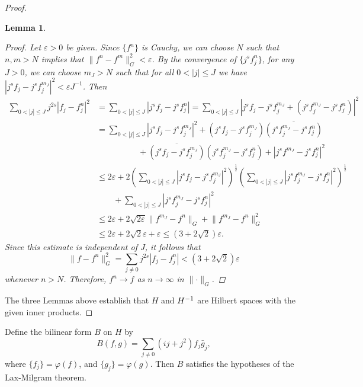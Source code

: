 \documentclass{homework}
\newtheorem{lemma}{Lemma}
\begin{document}
\begin{arabicparts}
\begin{proof}
\begin{lemma}
\begin{proof}
				Let $\varepsilon > 0$ be given. Since $\{f^n\}$ is Cauchy, we can choose $N$ such that $n,m > N$ implies that $\lVert f^n - f^m\rVert_G^2 < \varepsilon$. By the convergence of $\{j^sf^n_j\}$, for any $J > 0$, we can choose $m_J > N$ such that for all $0 < |j| \le J$ we have $|j^sf_j-j^sf^{m_J}_j|^2 < \varepsilon J^{-1}$. Then
				\newcommand{\lJ}{{0<|j|\le J}}
				\begin{align}
					\sum_\lJ j^{2s}|f_j - f^n_j|^2 &= \sum_\lJ |j^sf_j - j^sf^n_j| = \sum_\lJ |j^sf_j - j^sf^{m_J}_j + (j^sf^{m_J}_j - j^sf^n_j)|^2 \\
					&= \sum_\lJ |j^sf_j - j^sf^{m_J}_j|^2 + (j^sf_j-j^sf^{m_J}_j)\overline{(j^sf^{m_J}_j-j^sf^n_j)} \\
					&\qquad\qquad\quad{}+ \overline{(j^sf_j-j^sf^{m_J}_j)}(j^sf^{m_J}_j-j^sf^n_j) + |j^sf^{m_J}-j^sf^n_j|^2\\
					&\le 2\varepsilon + 2\left(\sum_\lJ |j^sf_j - j^sf^{m_J}_j|^2\right)^\frac{1}{2}\left(\sum_\lJ|j^sf^{m_J}_j-j^sf^n_j|^2\right)^\frac{1}{2} \\
					&\qquad{}+ \sum_\lJ |j^sf^{m_J}_j -j^sf^n_j|^2 \\
					&\le 2\varepsilon + 2\sqrt{2\varepsilon}\lVert f^{m_J} - f^n\rVert_G + \lVert f^{m_J} -f^n\rVert_G^2 \\
					&\le 2\varepsilon + 2\sqrt{2}\varepsilon + \varepsilon
					\le \left(3+2\sqrt{2}\right)\varepsilon.
				\end{align}
				Since this estimate is independent of $J$, it follows that
				\begin{equation}
					\lVert f - f^n\rVert_G^2 = \sum_{j\ne 0}j^{2s}|f_j-f^n_j| < \left(3+2\sqrt{2}\right)\varepsilon
				\end{equation}			
				whenever $n > N$. Therefore, $f^n \to f$ as $n\to \infty$ in $\lVert \cdot \rVert_G$.
			\end{proof}
		\end{lemma}
		
		The three Lemmas above establish that $H$ and ${H^{-1}}$ are Hilbert spaces with the given inner products.
		\end{proof}
		
		\questionpart
		Define the bilinear form $B$ on $H$ by
		\begin{equation}
			B(f,g) = \sum_{j\ne0}(ij + j^2)f_j\bar{g}_j,
		\end{equation}
		where $\{f_j\} = \varphi(f)$, and $\{g_j\} = \varphi(g)$.
		Then $B$ satisfies the hypotheses of the Lax-Milgram theorem.
		

\end{arabicparts}
\end{document}

